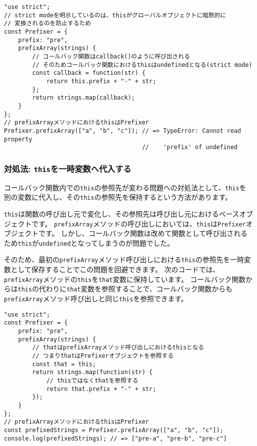 \begin{lstlisting}
"use strict";
// strict modeを明示しているのは、thisがグローバルオブジェクトに暗黙的に
// 変換されるのを防止するため
const Prefixer = {
    prefix: "pre",
    prefixArray(strings) {
        // コールバック関数はcallback()のように呼び出される
        // そのためコールバック関数におけるthisはundefinedとなる(strict mode)
        const callback = function(str) {
            return this.prefix + "-" + str;
        };
        return strings.map(callback);
    }
};
// prefixArrayメソッドにおけるthisはPrefixer
Prefixer.prefixArray(["a", "b", "c"]); // => TypeError: Cannot read property 
                                       //    'prefix' of undefined
\end{lstlisting}

\hypertarget{substitute-this}{%
\subsubsection{\texorpdfstring{対処法:
\texttt{this}を一時変数へ代入する}{対処法: thisを一時変数へ代入する}}\label{substitute-this}}

コールバック関数内での\texttt{this}の参照先が変わる問題への対処法として、\texttt{this}を別の変数に代入し、その\texttt{this}の参照先を保持するという方法があります。

\texttt{this}は関数の呼び出し元で変化し、その参照先は呼び出し元におけるベースオブジェクトです。
\texttt{prefixArray}メソッドの呼び出しにおいては、\texttt{this}は\texttt{Prefixer}オブジェクトです。
しかし、コールバック関数は改めて関数として呼び出されるため\texttt{this}が\texttt{undefined}となってしまうのが問題でした。

そのため、最初の\texttt{prefixArray}メソッド呼び出しにおける\texttt{this}の参照先を一時変数として保存することでこの問題を回避できます。
次のコードでは、\texttt{prefixArray}メソッドの\texttt{this}を\texttt{that}変数に保持しています。
コールバック関数からは\texttt{this}の代わりに\texttt{that}変数を参照することで、コールバック関数からも\texttt{prefixArray}メソッド呼び出しと同じ\texttt{this}を参照できます。

\begin{lstlisting}
"use strict";
const Prefixer = {
    prefix: "pre",
    prefixArray(strings) {
        // thatはprefixArrayメソッド呼び出しにおけるthisとなる
        // つまりthatはPrefixerオブジェクトを参照する
        const that = this;
        return strings.map(function(str) {
            // thisではなくthatを参照する
            return that.prefix + "-" + str;
        });
    }
};
// prefixArrayメソッドにおけるthisはPrefixer
const prefixedStrings = Prefixer.prefixArray(["a", "b", "c"]);
console.log(prefixedStrings); // => ["pre-a", "pre-b", "pre-c"]
\end{lstlisting}


